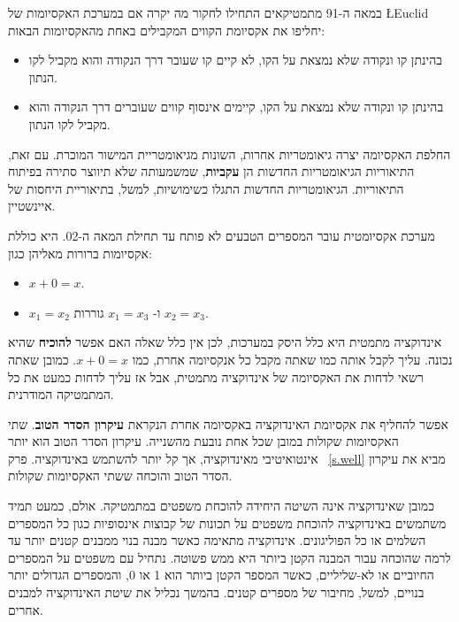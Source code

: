 במאה ה-91 מתמטיקאים התחילו לחקור מה יקרה אם במערכת האקסיומות של
\L{Euclid}
יחליפו את אקסיומת הקווים המקבילים באחת מהאקסיומות הבאות:
\begin{itemize}
\item
בהינתן קו ונקודה שלא נמצאת על הקו, לא קיים קו שעובר דרך הנקודה והוא מקביל לקו הנתון.
\item
בהינתן קו ונקודה שלא נמצאת על הקו, קיימים אינסוף קווים שעוברים דרך הנקודה והוא מקביל לקו הנתון.
\end{itemize}
החלפת האקסיומה יצרה גיאומטריות אחרות, השונות מגיאומטריית המישור המוכרת. עם זאת, התיאוריות הגיאומטריות החדשות הן
\textbf{עקביות},
 שמשמעותה שלא תיווצר סתירה בפיתוח התיאוריות. הגיאומטריות החדשות התגלו כשימושיות, למשל, בתיאוריית היחסות של איינשטיין.

מערכת אקסיומטית עובר המספרים הטבעים לא פותח עד תחילת המאה ה-02. היא כוללת אקסיומות ברורות מאליהן כגון:

\begin{itemize}
\item $x+0=x$.
\item $x_1=x_2$
ו-%
$x_1=x_3$
גוררות
$x_2=x_3$.
\end{itemize}
אינדוקציה מתמטית היא כלל היסק במערכות, לכן אין כלל שאלה האם אפשר
\textbf{להוכיח}
שהיא נכונה. עליך לקבל אותה כמו שאתה מקבל כל אנקסיומה אחרת, כמו
$x+0=x$.
כמובן שאתה רשאי לדחות את האקסיומה של אינדוקציה מתמטית, אבל אז עליך לדחות כמעט את כל המתמטיקה המודרנית.

אפשר להחליף את אקסיומת האינדוקציה באקסיומה אחרת הנקראת
\textbf{עיקרון הסדר הטוב}.
שתי האקסיומות שקולות במובן שכל אחת נובעת מהשנייה. עיקרון הסדר הטוב הוא יותר אינטואיטיבי מאינדוקציה, אך קל יותר להשתמש באינדוקציה. פרק~%
\ref{s.well}
מביא את עיקרון הסדר הטוב והוכחה ששתי האקסיומות שקולות.

כמובן שאינדוקציה אינה השיטה היחידה להוכחת משפטים במתמטיקה. אולם, כמעט תמיד משתמשים באינדוקציה להוכחת משפטים על תכונות של קבוצות אינסופיות כגון כל המספרים השלמים או כל הפוליגונים. אינדוקציה מתאימה כאשר מבנה בנוי ממבנים קטנים יותר עד לרמה שהוכחה עבור המבנה הקטן ביותר היא ממש פשוטה. נתחיל עם משפטים על המספרים החיוביים או לא-שליליים, כאשר המספר הקטן ביותר הוא 1 או 0, והמספרים הגדולים יותר בנויים, למשל, מחיבור של מספרים קטנים. בהמשך נכליל את שיטת האינדוקציה למבנים אחרים.

